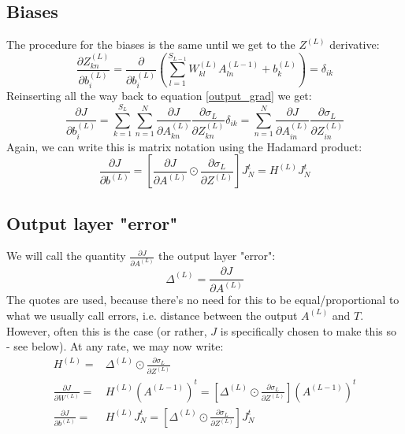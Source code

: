 \documentclass[12pt, a4paper]{article}
\numberwithin{equation}{section}
\begin{document}
\subsection{Biases}
The procedure for the biases is the same until we get to the $Z^{(L)}$ derivative:
\begin{equation}
\frac{\partial Z^{(L)}_{kn}}{\partial b^{(L)}_i}=\frac{\partial}{\partial b^{(L)}_i}\left(\sum_{l=1}^{S_{L-1}}W^{(L)}_{kl}A^{(L-1)}_{ln}+b^{(L)}_k\right)=\delta_{ik}
\end{equation}
Reinserting all the way back to equation \ref{output_grad} we get:
\begin{equation}
\frac{\partial J}{\partial b^{(L)}_i}=\sum_{k=1}^{S_L}\sum_{n=1}^N\frac{\partial J}{\partial A^{(L)}_{kn}}\frac{\partial\sigma_L}{\partial Z^{(L)}_{kn}}\delta_{ik}=\sum_{n=1}^N\frac{\partial J}{\partial A^{(L)}_{in}}\frac{\partial\sigma_L}{\partial Z^{(L)}_{in}}
\end{equation}
Again, we can write this is matrix notation using the Hadamard product:
\begin{equation}
\label{output_bias_matrix}
\frac{\partial J}{\partial b^{(L)}}=\left[\frac{\partial J}{\partial A^{(L)}}\odot\frac{\partial\sigma_L}{\partial Z^{(L)}}\right]J_N^t=H^{(L)}J_N^t
\end{equation}

\subsection{Output layer "error"}
We will call the quantity $\frac{\partial J}{\partial A^{(L)}}$ the output layer "error":
\begin{equation}
\Delta^{(L)}=\frac{\partial J}{\partial A^{(L)}}
\end{equation}
The quotes are used, because there's no need for this to be equal/proportional to what we usually call errors, i.e. distance between the output $A^{(L)}$ and $T$. However, often this is the case (or rather, $J$ is specifically chosen to make this so - see below). At any rate, we may now write:
\begin{align}
\label{output_weights_H}
H^{(L)}=&\Delta^{(L)}\odot\frac{\partial\sigma_L}{\partial Z^{(L)}}\\
\frac{\partial J}{\partial W^{(L)}}=&H^{(L)}\left(A^{(L-1)}\right)^t=\left[\Delta^{(L)}\odot\frac{\partial\sigma_L}{\partial Z^{(L)}}\right]\left(A^{(L-1)}\right)^t\\
\label{output_bias_H}
\frac{\partial J}{\partial b^{(L)}}=&H^{(L)}J_N^t=\left[\Delta^{(L)}\odot\frac{\partial\sigma_L}{\partial Z^{(L)}}\right]J_N^t
\end{align}
\end{document}
